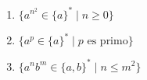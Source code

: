 \begin{ejercicio}
\begin{enumerate}

        \item $\{a^{n^2} \in \{a\}^{\ast} \mid n\geq 0\}$
        \item $\{a^p \in \{a\}^{\ast} \mid p \text{ es primo}\}$
        \item $\{a^nb^m \in \{a,b\}^{\ast} \mid n\leq m^2\}$
    \end{enumerate}

\end{ejercicio}

